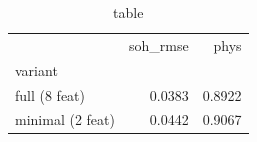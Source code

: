 \begin{table}
\caption{table}
\label{tab:table}
\begin{tabular}{lrr}
\toprule
 & soh\_rmse & phys \\
variant &  &  \\
\midrule
full (8 feat) & 0.0383 & 0.8922 \\
minimal (2 feat) & 0.0442 & 0.9067 \\
\bottomrule
\end{tabular}
\end{table}
